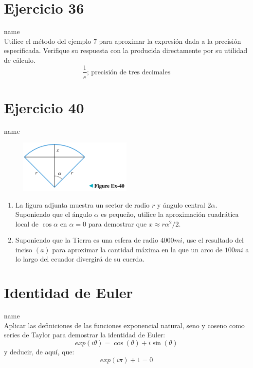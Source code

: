 \documentclass[12pt]{article}
\begin{document}
\section{Ejercicio 36} name \\

Utilice el método del ejemplo 7 para aproximar la expresión dada a la precisión especificada. Verifique su respuesta con la producida directamente por su utilidad de cálculo.
\[\frac{1}{e}\text{; precisión de tres decimales}\]



\section{Ejercicio 40} name \\

\begin{figure}[h!]
\centering
\includegraphics[width=0.5\textwidth]{../img/img_Lista2/2_40.png}
\end{figure}
\begin{enumerate}[label=(\alph*)]
\item La figura adjunta muestra un sector de radio $r$ y ángulo central $2 \alpha$. Suponiendo que el ángulo $\alpha$ es pequeño, utilice la aproximación cuadrática local de $\cos \alpha$ en $\alpha = 0$ para demostrar que $x \approx r \alpha ^2/2$.
\item Suponiendo que la Tierra es una esfera de radio $4000 mi$, use el resultado del inciso $(a)$ para aproximar la cantidad máxima en la que un arco de $100 mi$ a lo largo del ecuador divergirá de su cuerda.
\end{enumerate}

\section{Identidad de Euler} name \\

Aplicar las definiciones de las funciones exponencial natural, seno y coseno como series de Taylor para demostrar la identidad de Euler:
\[exp(i\theta) = \cos(\theta) + i \sin(\theta)\]
y deducir, de aquí, que:
\[exp(i\pi) + 1 = 0\]
\end{document}
